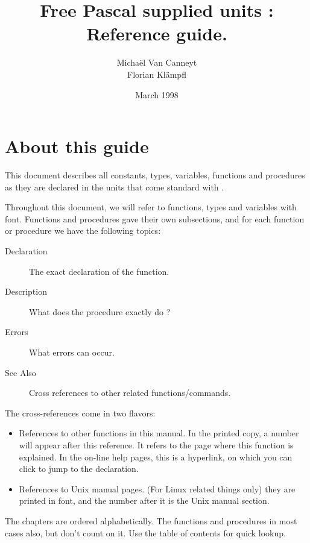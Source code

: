 \documentclass{report}
\begin{document}
\title{Free Pascal supplied units : \\ Reference guide.}
\date{March 1998}
\author{Micha\"el Van Canneyt\\ Florian Kl\"ampfl}
\maketitle
\tableofcontents
\newpage

\section*{About this guide}
This document describes all constants, types, variables, functions and
procedures as they are declared in the units that come standard with \fpc.

Throughout this document, we will refer to functions, types and variables
with  font. Functions and procedures gave their own
subsections, and for each function or procedure we have the following 
topics:
\begin{description}
\item [Declaration] The exact declaration of the function.
\item [Description] What does the procedure exactly do ?
\item [Errors] What errors can occur.
\item [See Also] Cross references to other related functions/commands.
\end{description}
The cross-references come in two flavors:
\begin{itemize}
\item References to other functions in this manual. In the printed copy, a
number will appear after this reference. It refers to the page where this
function is explained. In the on-line help pages, this is a hyperlink, on
which you can click to jump to the declaration.
\item References to Unix manual pages. (For Linux related things only) they
are printed in  font, and the number after it is the Unix
manual section.
\end{itemize}
The chapters are ordered alphabetically. The functions and procedures in
most cases also, but don't count on it. Use the table of contents for quick
lookup.

%
%













\printindex
\end{document}
